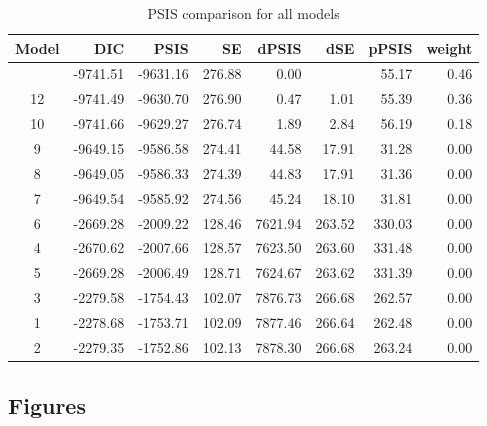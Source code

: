 \documentclass[
]{agujournal2019}
\begin{document}
\begin{longtable}[]{@{}crrrrrrr@{}}

\caption{\label{tbl-rq3-psis}PSIS comparison for all models}

\tabularnewline

\toprule\noalign{}
Model & DIC & PSIS & SE & dPSIS & dSE & pPSIS & weight \\
\midrule\noalign{}
\endhead
\bottomrule\noalign{}
\endlastfoot
11 & -9741.51 & -9631.16 & 276.88 & 0.00 & & 55.17 & 0.46 \\
12 & -9741.49 & -9630.70 & 276.90 & 0.47 & 1.01 & 55.39 & 0.36 \\
10 & -9741.66 & -9629.27 & 276.74 & 1.89 & 2.84 & 56.19 & 0.18 \\
9 & -9649.15 & -9586.58 & 274.41 & 44.58 & 17.91 & 31.28 & 0.00 \\
8 & -9649.05 & -9586.33 & 274.39 & 44.83 & 17.91 & 31.36 & 0.00 \\
7 & -9649.54 & -9585.92 & 274.56 & 45.24 & 18.10 & 31.81 & 0.00 \\
6 & -2669.28 & -2009.22 & 128.46 & 7621.94 & 263.52 & 330.03 & 0.00 \\
4 & -2670.62 & -2007.66 & 128.57 & 7623.50 & 263.60 & 331.48 & 0.00 \\
5 & -2669.28 & -2006.49 & 128.71 & 7624.67 & 263.62 & 331.39 & 0.00 \\
3 & -2279.58 & -1754.43 & 102.07 & 7876.73 & 266.68 & 262.57 & 0.00 \\
1 & -2278.68 & -1753.71 & 102.09 & 7877.46 & 266.64 & 262.48 & 0.00 \\
2 & -2279.35 & -1752.86 & 102.13 & 7878.30 & 266.68 & 263.24 & 0.00 \\

\end{longtable}

\subsection{Figures}\label{sec-appC}
\end{document}
